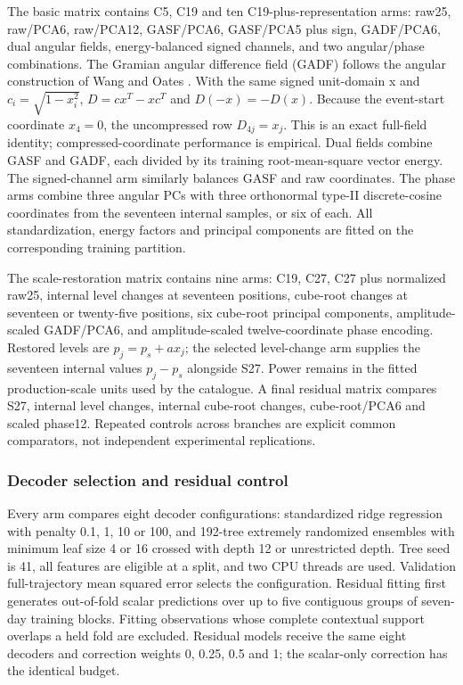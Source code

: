 \documentclass[a4paper,11pt]{article}
\begin{document}
The basic matrix contains C5, C19 and ten C19-plus-representation arms: raw25, raw/PCA6, raw/PCA12, GASF/PCA6, GASF/PCA5 plus sign, GADF/PCA6, dual angular fields, energy-balanced signed channels, and two angular/phase combinations. The Gramian angular difference field (GADF) follows the angular construction of Wang and Oates \citep{wang2015gaf}. With the same signed unit-domain x and \(c_i=\sqrt{1-x_i^2}\), \(D=cx^T-xc^T\) and \(D(-x)=-D(x)\). Because the event-start coordinate \(x_4=0\), the uncompressed row \(D_{4j}=x_j\). This is an exact full-field identity; compressed-coordinate performance is empirical. Dual fields combine GASF and GADF, each divided by its training root-mean-square vector energy. The signed-channel arm similarly balances GASF and raw coordinates. The phase arms combine three angular PCs with three orthonormal type-II discrete-cosine coordinates from the seventeen internal samples, or six of each. All standardization, energy factors and principal components are fitted on the corresponding training partition.

The scale-restoration matrix contains nine arms: C19, C27, C27 plus normalized raw25, internal level changes at seventeen positions, cube-root changes at seventeen or twenty-five positions, six cube-root principal components, amplitude-scaled GADF/PCA6, and amplitude-scaled twelve-coordinate phase encoding. Restored levels are \(p_j=p_s+a x_j\); the selected level-change arm supplies the seventeen internal values \(p_j-p_s\) alongside S27. Power remains in the fitted production-scale units used by the catalogue. A final residual matrix compares S27, internal level changes, internal cube-root changes, cube-root/PCA6 and scaled phase12. Repeated controls across branches are explicit common comparators, not independent experimental replications.

\subsubsection{Decoder selection and residual control}\label{decoder-selection-and-residual-control}

Every arm compares eight decoder configurations: standardized ridge regression with penalty 0.1, 1, 10 or 100, and 192-tree extremely randomized ensembles with minimum leaf size 4 or 16 crossed with depth 12 or unrestricted depth. Tree seed is 41, all features are eligible at a split, and two CPU threads are used. Validation full-trajectory mean squared error selects the configuration. Residual fitting first generates out-of-fold scalar predictions over up to five contiguous groups of seven-day training blocks. Fitting observations whose complete contextual support overlaps a held fold are excluded. Residual models receive the same eight decoders and correction weights 0, 0.25, 0.5 and 1; the scalar-only correction has the identical budget.
\end{document}
